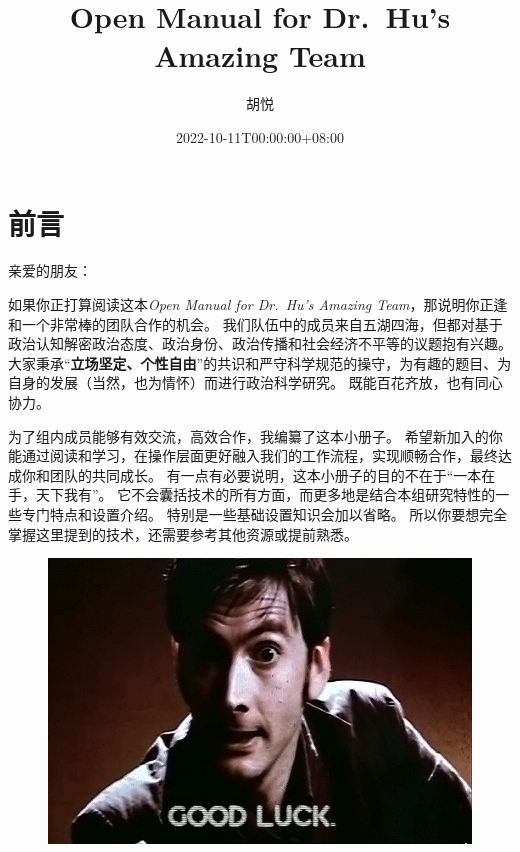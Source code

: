 \documentclass[
  letterpaper,
  DIV=11,
  numbers=noendperiod,
  oneside]{scrreprt}
\title{Open Manual for Dr.~Hu's Amazing Team}
\author{胡悦}
\date{2022-10-11T00:00:00+08:00}
\renewcommand*\contentsname{Table of contents}
\newcommand\contentsname{Table of contents}
\begin{document}
\maketitle
\ifdefined\Shaded\renewenvironment{Shaded}{\begin{tcolorbox}[frame hidden, borderline west={3pt}{0pt}{shadecolor}, enhanced, interior hidden, boxrule=0pt, breakable, sharp corners]}{\end{tcolorbox}}\fi

\renewcommand*\contentsname{Table of contents}
{
\hypersetup{linkcolor=}
\setcounter{tocdepth}{2}
\tableofcontents
}

\hypertarget{ux524dux8a00}{%
\chapter*{前言}\label{ux524dux8a00}}

亲爱的朋友：

如果你正打算阅读这本\emph{Open Manual for Dr.~Hu's Amazing
Team}，那说明你正逢和一个非常棒的团队合作的机会。
我们队伍中的成员来自五湖四海，但都对基于政治认知解密政治态度、政治身份、政治传播和社会经济不平等的议题抱有兴趣。
大家秉承``\textbf{立场坚定、个性自由}''的共识和严守科学规范的操守，为有趣的题目、为自身的发展（当然，也为情怀）而进行政治科学研究。
既能百花齐放，也有同心协力。

为了组内成员能够有效交流，高效合作，我编纂了这本小册子。
希望新加入的你能通过阅读和学习，在操作层面更好融入我们的工作流程，实现顺畅合作，最终达成你和团队的共同成长。
有一点有必要说明，这本小册子的目的不在于``一本在手，天下我有''。
它不会囊括技术的所有方面，而更多地是结合本组研究特性的一些专门特点和设置介绍。
特别是一些基础设置知识会加以省略。
所以你要想完全掌握这里提到的技术，还需要参考其他资源或提前熟悉。

\begin{figure}

{\centering \includegraphics{./images/goodluck.gif}

}

\end{figure}
\end{document}
